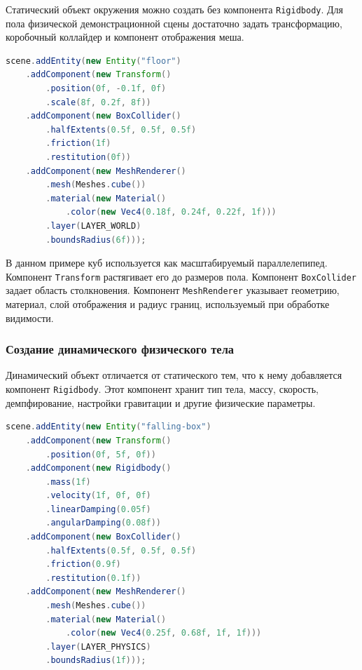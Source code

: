 Статический объект окружения можно создать без компонента \texttt{Rigidbody}. Для пола физической демонстрационной сцены достаточно задать трансформацию, коробочный коллайдер и компонент отображения меша.

\begin{lstlisting}[language=Java,caption={Создание пола сцены}]
scene.addEntity(new Entity("floor")
    .addComponent(new Transform()
        .position(0f, -0.1f, 0f)
        .scale(8f, 0.2f, 8f))
    .addComponent(new BoxCollider()
        .halfExtents(0.5f, 0.5f, 0.5f)
        .friction(1f)
        .restitution(0f))
    .addComponent(new MeshRenderer()
        .mesh(Meshes.cube())
        .material(new Material()
            .color(new Vec4(0.18f, 0.24f, 0.22f, 1f)))
        .layer(LAYER_WORLD)
        .boundsRadius(6f)));
\end{lstlisting}

В данном примере куб используется как масштабируемый параллелепипед. Компонент \texttt{Transform} растягивает его до размеров пола. Компонент \texttt{BoxCollider} задает область столкновения. Компонент \texttt{MeshRenderer} указывает геометрию, материал, слой отображения и радиус границ, используемый при обработке видимости.

\subsubsection{Создание динамического физического тела}

Динамический объект отличается от статического тем, что к нему добавляется компонент \texttt{Rigidbody}. Этот компонент хранит тип тела, массу, скорость, демпфирование, настройки гравитации и другие физические параметры.

\begin{lstlisting}[language=Java,caption={Создание динамического куба}]
scene.addEntity(new Entity("falling-box")
    .addComponent(new Transform()
        .position(0f, 5f, 0f))
    .addComponent(new Rigidbody()
        .mass(1f)
        .velocity(1f, 0f, 0f)
        .linearDamping(0.05f)
        .angularDamping(0.08f))
    .addComponent(new BoxCollider()
        .halfExtents(0.5f, 0.5f, 0.5f)
        .friction(0.9f)
        .restitution(0.1f))
    .addComponent(new MeshRenderer()
        .mesh(Meshes.cube())
        .material(new Material()
            .color(new Vec4(0.25f, 0.68f, 1f, 1f)))
        .layer(LAYER_PHYSICS)
        .boundsRadius(1f)));
\end{lstlisting}

